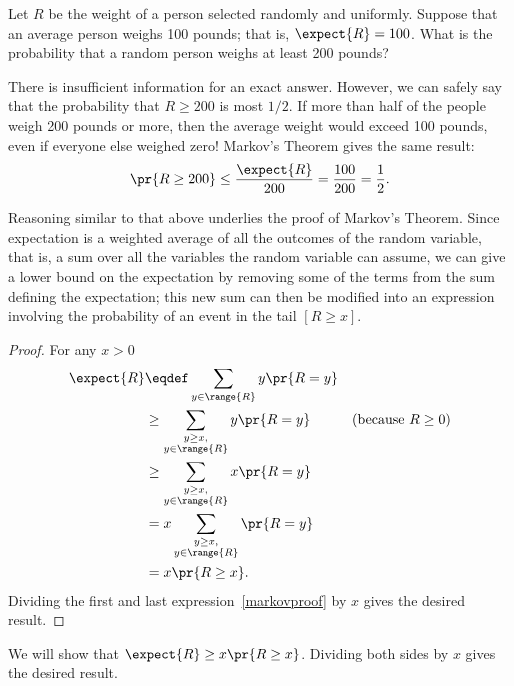 \begin{editingnotes}
Let $R$ be the weight of a person selected randomly and uniformly.
Suppose that an average person weighs 100 pounds; that is, $\expect{R} =
100$.  What is the probability that a random person weighs at least
200 pounds?

There is insufficient information for an exact answer.  However, we
can safely say that the probability that $R \geq 200$ is most
$1/2$.  If more than half of the people weigh 200 pounds or
more, then the average weight would exceed 100 pounds, even if
everyone else weighed zero!  Markov's Theorem gives the same result:
\begin{displaymath}
  \pr{R \geq 200} \leq \frac{\expect{R}}{200} = \frac{100}{200} = \frac{1}{2}.
\end{displaymath}

Reasoning similar to that above underlies the proof of Markov's
Theorem.  Since expectation is a weighted average of all the outcomes
of the random variable, that is, a sum over all the variables the random
variable can assume, we can give a lower bound on the expectation by
removing some of the terms from the sum defining the expectation; this
new sum can then be modified into an expression involving the
probability of an event in the tail $[R \geq x]$.

\end{editingnotes}

\begin{proof}%
For any $x > 0$
\begin{align}
  \expect{R}
  & \eqdef \sum_{y \in \range{R}} y\pr{R=y}\notag\\
  & \geq \sum_{\substack{y \geq x,\\ y \in \range{R}}} y\pr{R=y} & \text{(because $R \geq 0$)}\notag\\
  & \geq \sum_{\substack{y \geq x,\\ y \in \range{R}}} x\pr{R=y}\notag\\
  & = x \sum_{\substack{y \geq x,\\ y \in \range{R}}} \pr{R=y}\notag\\
  & = x \pr{R \geq x}.\label{markovproof}
\end{align}
Dividing the first and last expression~\eqref{markovproof} by $x$ gives
the desired result.
\end{proof}

\iffalse
We will show that $\expect{R} \geq x \pr{R \geq x}$.  Dividing
both sides by $x$ gives the desired result.

